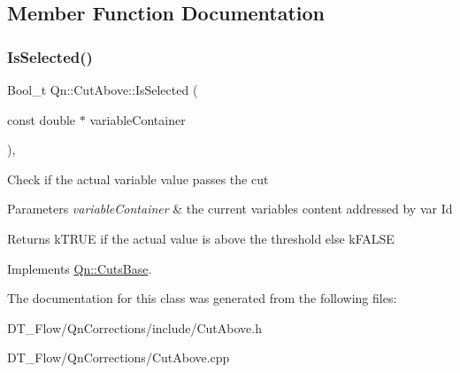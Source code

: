 \subsection{Member Function Documentation}
\mbox{\label{classQn_1_1CutAbove_a2d7ecca87d2d0c50724d795715f5cedd}} 
\subsubsection{\texorpdfstring{Is\+Selected()}{IsSelected()}}
{\footnotesize\ttfamily Bool\+\_\+t Qn\+::\+Cut\+Above\+::\+Is\+Selected (\begin{DoxyParamCaption}\item[{const double $\ast$}]{variable\+Container }\end{DoxyParamCaption})\hspace{0.3cm}{\ttfamily [inline]}, {\ttfamily [virtual]}}

Check if the actual variable value passes the cut


\begin{DoxyParams}{Parameters}
{\em variable\+Container} & the current variables content addressed by var Id \\
\hline
\end{DoxyParams}
\begin{DoxyReturn}{Returns}
k\+T\+R\+UE if the actual value is above the threshold else k\+F\+A\+L\+SE 
\end{DoxyReturn}


Implements \mbox{\hyperlink{classQn_1_1CutsBase_aab081fa4220144505ca838539d83aa8d}{Qn\+::\+Cuts\+Base}}.



The documentation for this class was generated from the following files\+:\begin{DoxyCompactItemize}
\item 
D\+T\+\_\+\+Flow/\+Qn\+Corrections/include/Cut\+Above.\+h\item 
D\+T\+\_\+\+Flow/\+Qn\+Corrections/Cut\+Above.\+cpp\end{DoxyCompactItemize}
